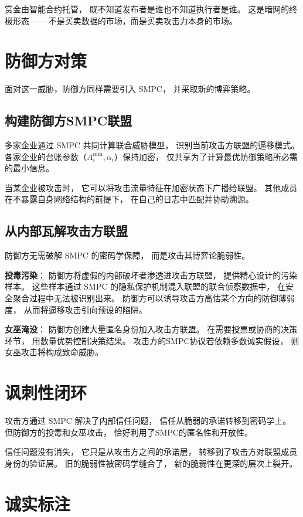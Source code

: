 \documentclass[11pt,a4paper]{article}
\begin{document}
赏金由智能合约托管，
既不知道发布者是谁也不知道执行者是谁。
这是暗网的终极形态——
不是买卖数据的市场，而是买卖攻击力本身的市场。

\section{防御方对策}

面对这一威胁，防御方同样需要引入 SMPC，
并采取新的博弈策略。

\subsection{构建防御方SMPC联盟}

多家企业通过 SMPC 共同计算联合威胁模型，
识别当前攻击方联盟的逼移模式。
各家企业的台账参数（\(A_i^{\min}, \alpha_i\)）保持加密，
仅共享为了计算最优防御策略所必需的最小信息。

当某企业被攻击时，
它可以将攻击流量特征在加密状态下广播给联盟。
其他成员在不暴露自身网络结构的前提下，
在自己的日志中匹配并协助溯源。

\subsection{从内部瓦解攻击方联盟}

防御方无需破解 SMPC 的密码学保障，
而是攻击其博弈论脆弱性。

\textbf{投毒污染}：
防御方将虚假的内部破坏者渗透进攻击方联盟，
提供精心设计的污染样本。
这些样本通过 SMPC 的隐私保护机制混入联盟的联合侦察数据中，
在安全聚合过程中无法被识别出来。
防御方可以诱导攻击方高估某个方向的防御薄弱度，
从而将逼移攻击引向预设的陷阱。

\textbf{女巫淹没}：
防御方创建大量匿名身份加入攻击方联盟。
在需要投票或协商的决策环节，
用数量优势控制决策结果。
攻击方的SMPC协议若依赖多数诚实假设，
则女巫攻击将构成致命威胁。

\section{讽刺性闭环}

攻击方通过 SMPC 解决了内部信任问题，
信任从脆弱的承诺转移到密码学上。
但防御方的投毒和女巫攻击，
恰好利用了SMPC的匿名性和开放性。

信任问题没有消失，
它只是从攻击方之间的承诺层，
转移到了攻击方对联盟成员身份的验证层。
旧的脆弱性被密码学缝合了，
新的脆弱性在更深的层次上裂开。

\section{诚实标注}
\end{document}
